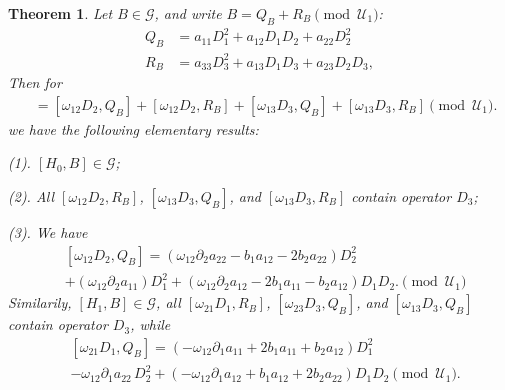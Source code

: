\documentclass[11pt,a4paper]{article}
\numberwithin{equation}{section}
\theoremstyle{journalplain}
\newtheorem{theorem}{Theorem}[section]
\theoremstyle{journaldef}
\begin{document}
\begin{theorem}\label{Thm3.1}
Let \(B\in\mathcal G\), and write \(B=Q_B+R_B\pmod{\mathcal U_1}\):
\begin{align}
    Q_B &= a_{11}D_1^2 + a_{12}D_1D_2 + a_{22} D_2^2\\
    R_B &= a_{33}D_3^2 + a_{13} D_1D_3 + a_{23} D_2D_3,
\end{align}
Then for \begin{align}
[H_0,B]
&=[\omega_{12}D_2,Q_B]
+[\omega_{12}D_2,R_B]
+[\omega_{13}D_3,Q_B]
+[\omega_{13}D_3,R_B]
\pmod{\mathcal U_1}.
\end{align}
we have the following elementary results:

(1). $[H_0,B] \in \mathcal G$;

(2). All $[\omega_{12}D_2,R_B]$, $[\omega_{13}D_3,Q_B]$, and $[\omega_{13}D_3,R_B]$ contain operator $D_3$;

(3). We have
\begin{align}
    &[\omega_{12}D_2,Q_B]
    = (\omega_{12}\partial_2a_{22} - b_1a_{12}-2b_2a_{22})D_2^2 \\&
    + (\omega_{12}\partial_2a_{11})D_1^2 + (\omega_{12}\partial_2a_{12} - 2b_1a_{11} - b_2a_{12})D_1D_2. \pmod{\mathcal U_1}
\end{align}
Similarily, $[H_1,B] \in \mathcal G$, all $[\omega_{21}D_1,R_B]$, $[\omega_{23}D_3,Q_B]$, and $[\omega_{13}D_3,Q_B]$ contain operator $D_3$, while
\begin{align}
&[\omega_{21}D_1,Q_B]
=
\left(
-\omega_{12}\partial_1a_{11}
+2b_1a_{11}
+b_2a_{12}
\right)D_1^2
\\
&-\omega_{12}\partial_1a_{22}\,D_2^2+
\left(
-\omega_{12}\partial_1a_{12}
+b_1a_{12}
+2b_2a_{22}
\right)D_1D_2
\pmod{\mathcal U_1}.
\end{align}
\end{theorem}
\end{document}

